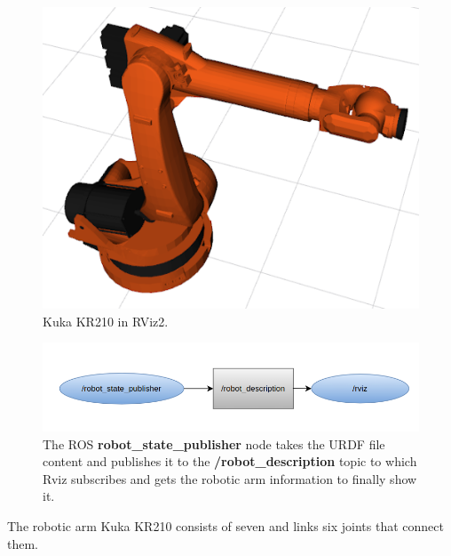 \documentclass[12pt,oneside]{article}
\begin{document}
\begin{figure}[H]
	\centering
	\includegraphics[width=0.7\linewidth]{kuka1}
	\caption[Rviz2 kuka]{Kuka KR210 in RViz2.}
	\label{fig:kuka1}
\end{figure}

\begin{figure}[H]
\centering
\includegraphics[width=0.9\linewidth]{rosgraph1}
\caption[The robot\_state\_publisher node]{The ROS \textbf{robot\_state\_publisher} node takes the URDF file content and publishes it to the \textbf{/robot\_description} topic to which Rviz subscribes and gets the robotic arm information to finally show it.}
\label{fig:rosgraph1}
\end{figure}

The robotic arm Kuka KR210 consists of seven and links six joints that connect them. 
\end{document}
